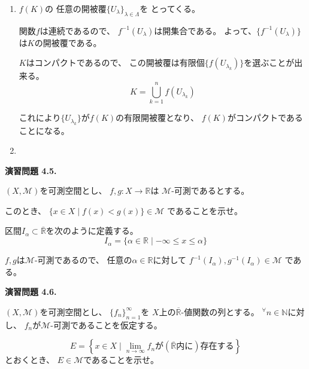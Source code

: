 \documentclass[12pt,b5paper]{ltjsarticle}
\begin{document}
\begin{enumerate}
 \item

      $f(K)$の
      任意の開被覆$\{U_{\lambda}\}_{\lambda\in\Lambda}$を
      とってくる。

      関数$f$は連続であるので、
      $f^{-1}(U_{\lambda})$は開集合である。
      よって、$\{ f^{-1}(U_{\lambda}) \}$は$K$の開被覆である。

      $K$はコンパクトであるので、
      この開被覆は有限個$\{ f( U_{\lambda_{k}} ) \}$を選ぶことが出来る。
      \begin{equation}
       K = \bigcup_{k=1}^{n} f( U_{\lambda_{k}} )
      \end{equation}

      これにより$\{ U_{\lambda_{k}} \}$が$f(K)$の有限開被覆となり、
      $f(K)$がコンパクトであることになる。

 \item




\end{enumerate}



\hrulefill

\textbf{演習問題 4.5.}

$(X,\mathcal{M})$を可測空間とし、
$f,g : X \to \mathbb{R}$は
$\mathcal{M}$-可測であるとする。

このとき、
$\{ x\in X \mid f(x) < g(x) \} \in \mathcal{M}$
であることを示せ。

\dotfill


区間$I_{\alpha} \subset \overline{\mathbb{R}}$を次のように定義する。
\begin{equation}
 I_{\alpha} = \{ \alpha\in \mathbb{R} \mid -\infty \leq x \leq \alpha  \}
\end{equation}

$f,g$は$\mathcal{M}$-可測であるので、
任意の$\alpha\in\mathbb{R}$に対して
$f^{-1}(I_{\alpha}), g^{-1}(I_{\alpha})\in\mathcal{M}$
である。



\hrulefill

\textbf{演習問題 4.6.}

$(X,\mathcal{M})$を可測空間とし、
$\{f_{n}\}_{n=1}^{\infty}$を
$X$上の$\overline{\mathbb{R}}$-値関数の列とする。
${}^{\forall}n\in\mathbb{N}$に対し、
$f_{n}$が$\mathcal{M}$-可測であることを仮定する。

\begin{equation}
 E =
  \left\{
   x\in X \mid
   \lim_{n\to\infty} f_{n}
   が
   (\overline{\mathbb{R}}内に)存在する
  \right\}
\end{equation}
とおくとき、
$E\in\mathcal{M}$であることを示せ。


\dotfill






\hrulefill
\end{document}
